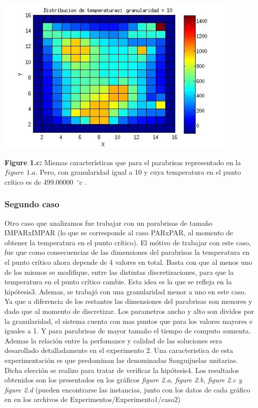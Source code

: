 \includegraphics[width=\textwidth,height=3.0in,keepaspectratio
]{140x140h10.jpg} \newline
\begin {flushleft}
\textbf{Figure 1.c:} Mismas características que para el parabrisas representado en la $figure$ $1.a$. Pero, con granularidad igual a 10 y cuya temperatura en el punto crítico es de 499.00000\hspace{-1.5mm}$\phantom{a}^{\circ}$c .
\end{flushleft}


\subsubsection{Segundo caso}



Otro caso que analizamos fue trabajar con un parabrisas de tamaño IMPARxIMPAR (lo que se corresponde al caso PARxPAR, al momento de obtener la temperatura en el punto crítico). El mótivo de trabajar con este caso, fue que como consecuencias de las dimensiones del parabrisas la temperatura en el punto crítico ahora depende de 4 valores en total. Basta con que al menos uno de los mismos se modifique, entre las distintas discretizaciones, para que la temperatura en el punto crítico cambie. Esta idea es la que se refleja en la hipótesis3.\newline
Ademas, se trabajó con una granularidad menor a uno en este caso. Ya que a diferencia de los restantes las dimensiones del parabrisas son menores y dado que al momento de discretizar. Los parametros ancho y alto son dividos por la granularidad, el sistema cuenta con mas puntos que para los valores mayores e iguales a 1. Y para parabrisas de mayor tamaño el tiempo de computo aumenta. Ademas la relación entre la perfomance y calidad de las soluciones sera desarollado detalladamente en el experimento 2.  
Una caracteristica de esta experimentación es que predominan las denominadas Sanguijuelas unitarias. Dicha elección se realizo para tratar de verificar la hipótesis4. Los resultados obtenidos son los presentados en los gráficos \textit{figure 2.a, figure 2.b, figure 2.c y figure 2.d} (pueden encontrarse las instancias, junto con los datos de cada gráfico en en los archivos de Experimentos/Experimento1/caso2)\newline


